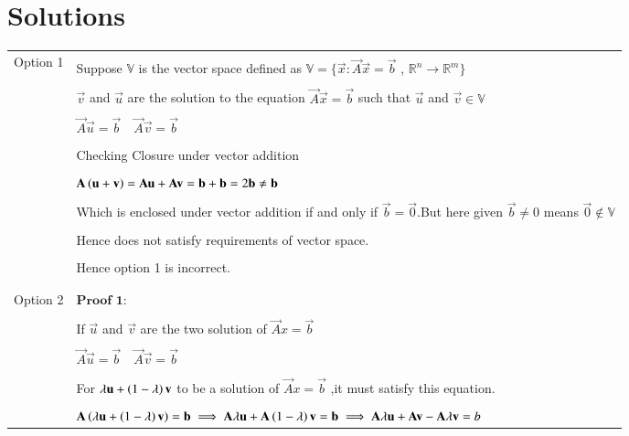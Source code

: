 \documentclass[journal,12pt]{IEEEtran}
\begin{document}
\section{\textbf{Solutions}}
\renewcommand{\thetable}{1}
\begin{longtable}{|l|l|}
\hline
\multirow{3}{*}{Option 1} & \\
&Suppose $\mathbb{V}$ is the vector space defined as $\mathbb{V}=\{\vec{x}:\vec{A}\vec{x}=\vec{b}$ , $\mathbb{R}^n\xrightarrow{}\mathbb{R}^m\}$\\
&\\
& $\vec{v}$ and $\vec{u}$ are the solution to the equation $\vec{A}\vec{x}=\vec{b}$  such that $\vec{u}$ and  $\vec{v}\in \mathbb{V}$\\
&\\
&$\vec{A}\vec{u}=\vec{b}\quad\vec{A}\vec{v}=\vec{b}$\\
&\\
&Checking Closure under vector addition\\
&\\
&$\mathbf{A}\left(\mathbf{u+v}\right)=\mathbf{A}\mathbf{u}+\mathbf{A}\mathbf{v}=\mathbf{b}+\mathbf{b}=2\mathbf{b}\neq\mathbf{b}$\\
&\\
&Which is enclosed under vector addition if and only if $\vec{b}=\vec{0}$.But here given $\vec{b}\neq0$ means $\vec{0} \not\in \mathbb{V}$\\
&\\
&Hence does not satisfy requirements of vector space.\\
&\\
&Hence option 1 is incorrect.\\
&\\
\hline
&\\
Option 2 &$\textbf{Proof 1:}$\\
&\\
&If $\vec{u}$ and $\vec{v}$ are the two solution of $\vec{A}x=\vec{b}$ \\
&\\
&$\vec{A}\vec{u}=\vec{b}\quad\vec{A}\vec{v}=\vec{b}$\\
&\\
&For $\lambda \mathbf{u}  +\left(1-\lambda\right)\mathbf{v}$ to be a solution of $\vec{A}x=\vec{b}$ ,it must satisfy this equation.\\
&\\
& $\mathbf{A}\left(\lambda\mathbf{u}  +\left(1-\lambda\right)\mathbf{v}\right)=\mathbf{b} \implies\mathbf{A}\lambda\mathbf{u} + \mathbf{A}\left(1-\lambda\right)\mathbf{v}=\mathbf{b}\implies\mathbf{A}\lambda\mathbf{u}+\mathbf{A}\mathbf{v}-\mathbf{A}\lambda\mathbf{v}=b$\\

\end{longtable}
\end{document}
